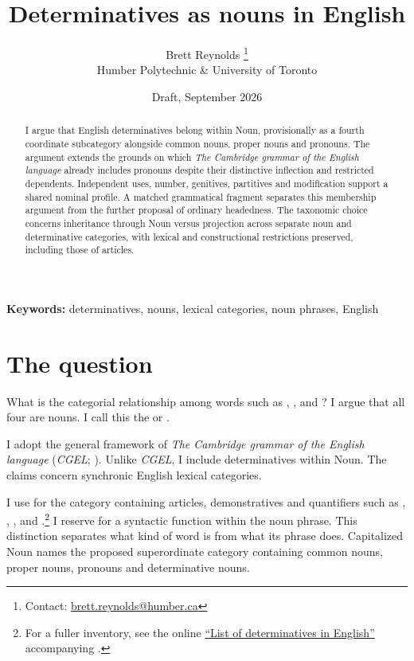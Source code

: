 \documentclass[12pt]{article}
\title{Determinatives as nouns in English}
\author{Brett Reynolds \orcidlink{0000-0003-0073-7195}%
\thanks{Contact: \href{mailto:brett.reynolds@humber.ca}{brett.reynolds@humber.ca}}\\
Humber Polytechnic \& University of Toronto}
\date{Draft, September 2026}
\begin{document}
\maketitle

\begin{abstract}
I argue that English determinatives belong within Noun, provisionally as a fourth coordinate subcategory alongside common nouns, proper nouns and pronouns. The argument extends the grounds on which \textit{The Cambridge grammar of the English language} already includes pronouns despite their distinctive inflection and restricted dependents. Independent uses, number, genitives, partitives and modification support a shared nominal profile. A matched grammatical fragment separates this membership argument from the further proposal of ordinary headedness. The taxonomic choice concerns inheritance through Noun versus projection across separate noun and determinative categories, with lexical and constructional restrictions preserved, including those of articles.
\end{abstract}

\noindent\textbf{Keywords:} determinatives, nouns, lexical categories, noun phrases, English

\section{The question}\label{sec:intro}

What is the categorial relationship among words such as , ,  and ? I argue that all four are nouns. I call this the  or .

I adopt the general framework of \textit{The Cambridge grammar of the English language} (\textit{CGEL}; \citealt{huddleston2002}). Unlike \textit{CGEL}, I include determinatives within Noun. The claims concern synchronic English lexical categories.

I use  for the category containing articles, demonstratives and quantifiers such as , , ,  and .\footnote{For a fuller inventory, see the online \href{https://www.cambridge.org/highereducation/api/resources/2AC8DF5CA558F8A6FCDFACD0EAF8EA08}{\enquote{List of determinatives in English}} accompanying \textcite{Huddleston2021}.} I reserve  for a syntactic function within the noun phrase. This distinction separates what kind of word  is from what its phrase does. Capitalized Noun names the proposed superordinate category containing common nouns, proper nouns, pronouns and determinative nouns.
\end{document}
